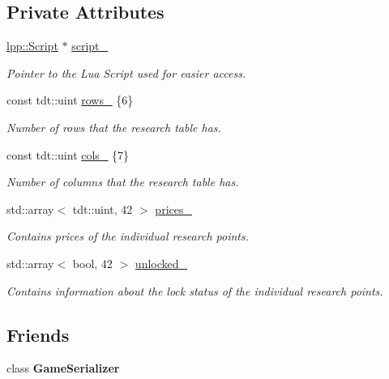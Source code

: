 \subsection*{Private Attributes}
\begin{DoxyCompactItemize}
\item 
\hyperlink{classlpp_1_1_script}{lpp\+::\+Script} $\ast$ \hyperlink{class_research_window_af7f3013563f378a37e3b70c8fea0b555}{script\+\_\+}
\begin{DoxyCompactList}\small\item\em Pointer to the Lua Script used for easier access. \end{DoxyCompactList}\item 
const tdt\+::uint \hyperlink{class_research_window_aae4b998d4c40d8f05029968abb783c83}{rows\+\_\+} \{6\}
\begin{DoxyCompactList}\small\item\em Number of rows that the research table has. \end{DoxyCompactList}\item 
const tdt\+::uint \hyperlink{class_research_window_a52c91c5c4aded859123aa455b57820e1}{cols\+\_\+} \{7\}
\begin{DoxyCompactList}\small\item\em Number of columns that the research table has. \end{DoxyCompactList}\item 
std\+::array$<$ tdt\+::uint, 42 $>$ \hyperlink{class_research_window_afee1be8c37a9c599b2d56a12258f1a8f}{prices\+\_\+}
\begin{DoxyCompactList}\small\item\em Contains prices of the individual research points. \end{DoxyCompactList}\item 
std\+::array$<$ bool, 42 $>$ \hyperlink{class_research_window_a7e531797d054408609f43d633a43c07c}{unlocked\+\_\+}
\begin{DoxyCompactList}\small\item\em Contains information about the lock status of the individual research points. \end{DoxyCompactList}\end{DoxyCompactItemize}
\subsection*{Friends}
\begin{DoxyCompactItemize}
\item 
class {\bfseries Game\+Serializer}\hypertarget{class_research_window_a6f4a2258d01e962995f3a4743b711864}{}\label{class_research_window_a6f4a2258d01e962995f3a4743b711864}

\end{DoxyCompactItemize}
